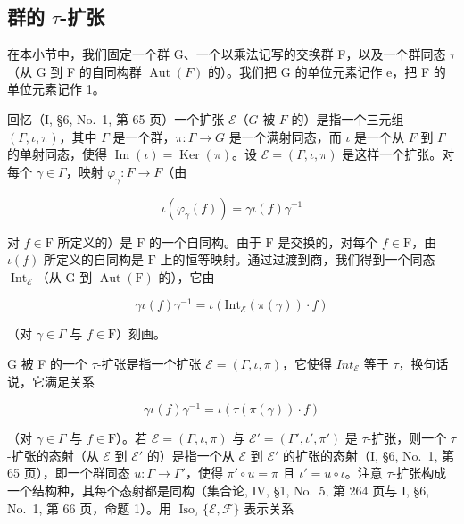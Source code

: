 \subsection{\texorpdfstring{群的 \(\tau\)-扩张}{群的 \textbackslash tau-扩张}}

在本小节中，我们固定一个群 G、一个以乘法记写的交换群 F，以及一个群同态 \(\tau\)（从 G 到 F 的自同构群 \(\operatorname{Aut}(F)\) 的）。我们把 G 的单位元素记作 e，把 F 的单位元素记作 1。

回忆（I, §6, No.~1, 第 65 页）一个扩张 \(\mathcal{E}\)（\(G\) 被 \(F\) 的）是指一个三元组 \((\Gamma, \iota, \pi)\)，其中 \(\Gamma\) 是一个群，\(\pi: \Gamma \to G\) 是一个满射同态，而 \(\iota\) 是一个从 \(F\) 到 \(\Gamma\) 的单射同态，使得 \(\operatorname{Im}(\iota) = \operatorname{Ker}(\pi)\)。设 \(\mathcal{E} = (\Gamma, \iota, \pi)\) 是这样一个扩张。对每个 \(\gamma \in \Gamma\)，映射 \(\varphi_{\gamma}: F \to F\)（由

\[
\iota (\varphi_ {\gamma} (f)) = \gamma \iota (f) \gamma^ {- 1}
\]

对 \(f \in \mathrm{F}\) 所定义的）是 \(\mathrm{F}\) 的一个自同构。由于 \(\mathrm{F}\) 是交换的，对每个 \(f \in \mathrm{F}\)，由 \(\iota(f)\) 所定义的自同构是 \(\mathrm{F}\) 上的恒等映射。通过过渡到商，我们得到一个同态 \(\operatorname{Int}_{\mathcal{E}}\)（从 \(\mathrm{G}\) 到 \(\operatorname{Aut}(\mathrm{F})\) 的），它由

\[
\gamma \iota (f) \gamma^ {- 1} = \iota (\mathrm{Int} _ {\mathcal {E}} (\pi (\gamma)) \cdot f)
\]

（对 \(\gamma \in \Gamma\) 与 \(f\in \mathrm{F}\)）刻画。

G 被 F 的一个 \(\tau\)-扩张是指一个扩张 \(\mathcal{E} = (\Gamma, \iota, \pi)\)，它使得 \(Int_{\mathcal{E}}\) 等于 \(\tau\)，换句话说，它满足关系

\[
\gamma \iota (f) \gamma^ {- 1} = \iota (\tau (\pi (\gamma)) \cdot f)\tag{1}
\]

（对 \(\gamma \in \Gamma\) 与 \(f \in \mathrm{F}\)）。若 \(\mathcal{E} = (\Gamma, \iota, \pi)\) 与 \(\mathcal{E}' = (\Gamma', \iota', \pi')\) 是 \(\tau\)-扩张，则一个 \(\tau\)-扩张的态射（从 \(\mathcal{E}\) 到 \(\mathcal{E}'\) 的）是指一个从 \(\mathcal{E}\) 到 \(\mathcal{E}'\) 的扩张的态射（I, §6, No.~1, 第 65 页），即一个群同态 \(u: \Gamma \to \Gamma'\)，使得 \(\pi' \circ u = \pi\) 且 \(\iota' = u \circ \iota\)。注意 \(\tau\)-扩张构成一个结构种，其每个态射都是同构（集合论, IV, §1, No.~5, 第 264 页与 I, §6, No.~1, 第 66 页，命题 1）。用 \(\operatorname{Iso}_{\tau} \{\mathcal{E}, \mathcal{F}\}\) 表示关系

